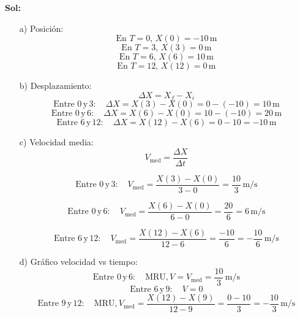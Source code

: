 \begin{center}

\noindent

\textbf{Sol:}
\begin{enumerate}
    \item[a)] Posición:
    \[
    \text{En } T=0, \, X(0) = -10 \, \text{m}
    \]
    \[
    \text{En } T=3, \, X(3) = 0 \, \text{m}
    \]
    \[
    \text{En } T=6, \, X(6) = 10 \, \text{m}
    \]
    \[
    \text{En } T=12, \, X(12) = 0 \, \text{m}
    \]

    \item[b)] Desplazamiento:
    \[
    \Delta X = X_f - X_i
    \]
    \[
    \text{Entre } 0 \, \text{y} \, 3: \quad \Delta X = X(3) - X(0) = 0 - (-10) = 10 \, \text{m}
    \]
    \[
    \text{Entre } 0 \, \text{y} \, 6: \quad \Delta X = X(6) - X(0) = 10 - (-10) = 20 \, \text{m}
    \]
    \[
    \text{Entre } 6 \, \text{y} \, 12: \quad \Delta X = X(12) - X(6) = 0 - 10 = -10 \, \text{m}
    \]
\end{enumerate}
\end{center}

\begin{enumerate}
    \item[c)] Velocidad media:
    \[
    V_{\text{med}} = \frac{\Delta X}{\Delta t}
    \]

    \[
    \text{Entre } 0 \, \text{y} \, 3: \quad V_{\text{med}} = \frac{X(3) - X(0)}{3 - 0} = \frac{10}{3} \, \text{m/s}
    \]

    \[
    \text{Entre } 0 \, \text{y} \, 6: \quad V_{\text{med}} = \frac{X(6) - X(0)}{6 - 0} = \frac{20}{6} = 6 \, \text{m/s}
    \]

    \[
    \text{Entre } 6 \, \text{y} \, 12: \quad V_{\text{med}} = \frac{X(12) - X(6)}{12 - 6} = \frac{-10}{6} = -\frac{10}{6} \, \text{m/s}
    \]

    \item[d)] Gráfico velocidad vs tiempo:
    \[
    \text{Entre } 0 \, \text{y} \, 6: \quad \text{MRU,} \, V = V_{\text{med}} = \frac{10}{3} \, \text{m/s}
    \]
    \[
    \text{Entre } 6 \, \text{y} \, 9: \quad V = 0
    \]
    \[
    \text{Entre } 9 \, \text{y} \, 12: \quad \text{MRU,} \, V_{\text{med}} = \frac{X(12) - X(9)}{12 - 9} = \frac{0 - 10}{3} = -\frac{10}{3} \, \text{m/s}
    \]
\end{enumerate}

